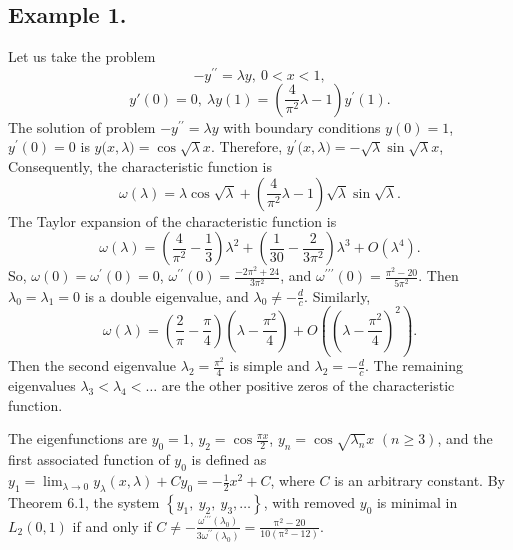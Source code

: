 \documentclass[pdflatex,sn-mathphys-num]{sn-jnl}%
\theoremstyle{thmstyleone}%
\theoremstyle{thmstyletwo}%
\theoremstyle{thmstylethree}%
\theoremstyle{definition}
\theoremstyle{remark}
\numberwithin{equation}{section}
\begin{document}
\subsection*{Example 1.}Let us take the problem  
$$
-y^{\prime \prime }=\lambda y,\ 0<x<1,
$$
$$
y'(0)=0,\ 
{\lambda}y(1)=\left(\frac{4}{\pi^2}{\lambda }-1\right)y^{\prime }(1).
$$
The solution of problem $-y^{\prime \prime }=\lambda y$ with boundary conditions $y(0)=1$, $y^\prime(0)=0$ is $y({x,\lambda)}=\cos{\sqrt{\lambda}x}$. Therefore, $y^\prime({x,\lambda)}=-{\sqrt{\lambda}}\sin{\sqrt{\lambda}x}$, Consequently, the characteristic function is$$\omega(\lambda) = {\lambda}\cos{\sqrt{\lambda}}+\left(\frac{4}{\pi^2}{\lambda }-1\right){\sqrt{\lambda}}\sin{\sqrt{\lambda}}.
$$
The Taylor expansion of the characteristic function is \[\omega(\lambda) =  \left(\frac{4}{\pi^2} - \frac{1}{3}\right)\lambda^2 + \left(\frac{1}{30} - \frac{2}{3\pi^2}\right)\lambda^3 + O(\lambda^4).\]
So, $\omega(0)=\omega^\prime(0)=0$, $\omega^{\prime\prime}(0)=\frac{-2 \pi^{2}+24}{3 \pi^{2}}$, and $\omega^{\prime\prime\prime}(0)=\frac{\pi^{2}-20}{5 \pi^{2}}$.
Then
$\lambda _{0}=\lambda _{1}=0$ is a double eigenvalue, and $\lambda _{0}\neq-\frac{d}{c}$. Similarly,
$$\omega(\lambda) = \left(\frac{2}{\pi} - \frac{\pi}{4}\right)\left(\lambda - \frac{\pi^2}{4}\right) +  O\left(\left(\lambda - \frac{\pi^2}{4}\right)^2\right).$$
Then the second eigenvalue $\lambda _{2}=\frac{\pi^2}{4}$ is simple and $\lambda _{2}=-\frac{d}{c}$. The remaining eigenvalues $\lambda _{3}<\lambda _{4}<\ldots$ are the other positive zeros  of the characteristic function.

The eigenfunctions are $y_{0}=1$, $y_{2}=\cos{\frac{\pi x}{2}}$, $y_{n}=\cos{\sqrt{\lambda _{n}}x}$ $(n\ge 3)$, and the first associated function of $y_{0}$ is defined as $y_{1}=\lim_{\lambda\to 0}y_\lambda(x,\lambda)+Cy_0=-\frac{1}{2}x^2+C$, where $C$ is
an arbitrary constant.
By Theorem 6.1,
the system $\left\{ y_{1},\ y_{2},\ y_{3},\ldots\right\}$,  with removed $y_{0}$ is minimal in $L_2(0,1)$ if and only if $C\ne-\frac{\omega^{\prime\prime\prime}(\lambda_0)}{3\omega^{\prime\prime}(\lambda_0)}=\frac{\mathrm{\pi}^{2}-20}{10 \left(\mathrm{\pi}^{2}-12\right)}$.
\end{document}
